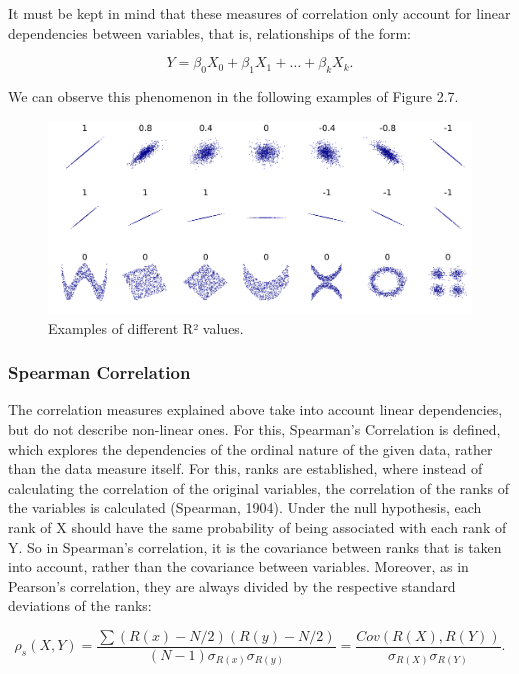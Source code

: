 It must be kept in mind that these measures of correlation only account for linear dependencies between variables, that is, relationships of the form:

\begin{equation}
    Y = \beta_{0}X_{0} + \beta_{1}X_{1} + \dots + \beta_{k}X_{k}.
\end{equation}

We can observe this phenomenon in the following examples of Figure 2.7.

\begin{figure}[h!]
\centering
\includegraphics[scale=0.2]{Images/Methods/Correlation/CorrelationValues.png}
\caption{Examples of different R² values.}
\end{figure}    


\subsubsection{Spearman Correlation}
The correlation measures explained above take into account linear dependencies, but do not describe non-linear ones. For this, Spearman's Correlation is defined, which explores the dependencies of the ordinal nature of the given data, rather than the data measure itself. For this, ranks are established, where instead of calculating the correlation of the original variables, the correlation of the ranks of the variables is calculated (Spearman, 1904).  Under the null hypothesis, each rank of X should have the same probability of being associated with each rank of Y. So in Spearman's correlation, it is the covariance between ranks that is taken into account, rather than the covariance between variables. Moreover, as in Pearson's correlation, they are always divided by the respective standard deviations of the ranks:

\begin{equation}
    \rho_s(X,Y)=\frac{\sum(R(x)-N/2)(R(y)-N/2)}{(N-1)\sigma_{R(x)}\sigma_{R(y)}}=\frac{Cov(R(X),R(Y))}{\sigma_{R(X)}\sigma_{R(Y)}}.
\end{equation}

